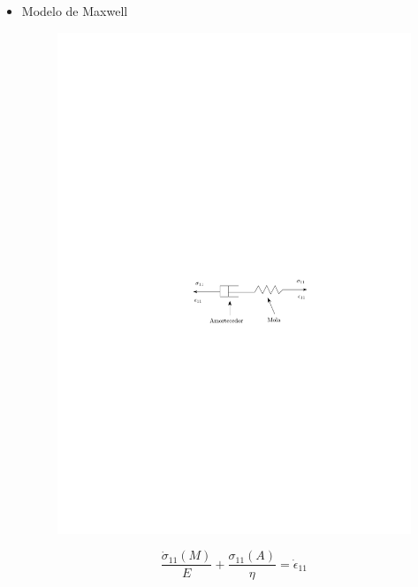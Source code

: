 \documentclass[a4paper, 12pt, brazilian]{article}
\begin{document}
\begin{itemize}
		\begin{itemize}
			\item Modelo de Maxwell	
			\begin{figure}[H]
				\centering
				\includegraphics[scale=1.1]{images/maxwell}
			\end{figure}
		
			\begin{equation}
				\dfrac{\dot{\sigma}_{11}(M)}{E}+\dfrac{\sigma_{11}(A)}{\eta}=\dot{\epsilon}_{11}
			\end{equation}
			

\end{itemize}
\end{itemize}
\end{document}
